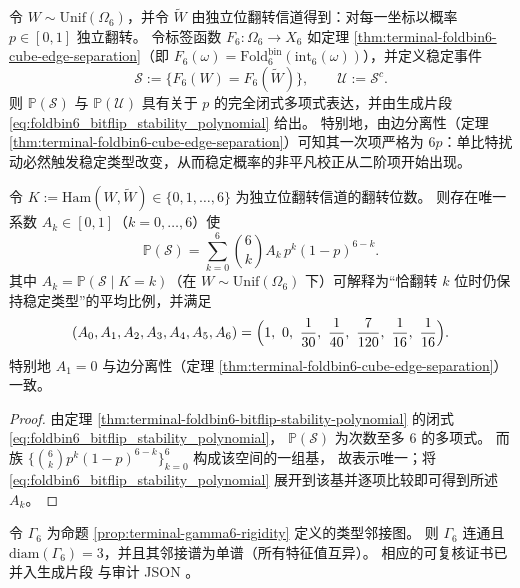 \begin{theorem}\label{thm:terminal-foldbin6-bitflip-stability-polynomial}
令 \(W\sim\mathrm{Unif}(\Omega_6)\)，并令 \(\widetilde W\) 由独立位翻转信道得到：对每一坐标以概率 \(p\in[0,1]\) 独立翻转。
令标签函数 \(F_6:\Omega_6\to X_6\) 如定理 \ref{thm:terminal-foldbin6-cube-edge-separation}（即 \(F_6(\omega)=\mathrm{Fold}^{\mathrm{bin}}_6(\mathrm{int}_6(\omega))\)），并定义稳定事件
\[
\mathcal S:=\{F_6(W)=F_6(\widetilde W)\},
\qquad
\mathcal U:=\mathcal S^c.
\]
则 \(\mathbb{P}(\mathcal S)\) 与 \(\mathbb{P}(\mathcal U)\) 具有关于 \(p\) 的完全闭式多项式表达，并由生成片段 \eqref{eq:foldbin6_bitflip_stability_polynomial} 给出。
特别地，由边分离性（定理 \ref{thm:terminal-foldbin6-cube-edge-separation}）可知其一次项严格为 \(6p\)：单比特扰动必然触发稳定类型改变，从而稳定概率的非平凡校正从二阶项开始出现。
\end{theorem}


\begin{corollary}\label{cor:terminal-foldbin6-bitflip-stability-Ak}
令 \(K:=\mathrm{Ham}(W,\widetilde W)\in\{0,1,\dots,6\}\) 为独立位翻转信道的翻转位数。
则存在唯一系数 \(A_k\in[0,1]\)（\(k=0,\dots,6\)）使
\[
\mathbb{P}(\mathcal S)=\sum_{k=0}^{6}\binom{6}{k}A_k\,p^{k}(1-p)^{6-k}.
\]
其中 \(A_k=\mathbb{P}(\mathcal S\mid K=k)\)（在 \(W\sim\mathrm{Unif}(\Omega_6)\) 下）可解释为“恰翻转 \(k\) 位时仍保持稳定类型”的平均比例，并满足
\[
(A_0,A_1,A_2,A_3,A_4,A_5,A_6)=\Bigl(1,\ 0,\ \frac{1}{30},\ \frac{1}{40},\ \frac{7}{120},\ \frac{1}{16},\ \frac{1}{16}\Bigr).
\]
特别地 \(A_1=0\) 与边分离性（定理 \ref{thm:terminal-foldbin6-cube-edge-separation}）一致。
\end{corollary}
\begin{proof}
由定理 \ref{thm:terminal-foldbin6-bitflip-stability-polynomial} 的闭式 \eqref{eq:foldbin6_bitflip_stability_polynomial}，
\(\mathbb{P}(\mathcal S)\) 为次数至多 \(6\) 的多项式。
而族 \(\{\binom{6}{k}p^k(1-p)^{6-k}\}_{k=0}^6\) 构成该空间的一组基，
故表示唯一；将 \eqref{eq:foldbin6_bitflip_stability_polynomial} 展开到该基并逐项比较即可得到所述 \(A_k\)。
\end{proof}

\begin{corollary}\label{cor:terminal-gamma6-diameter-simple-spectrum}
令 \(\Gamma_6\) 为命题 \ref{prop:terminal-gamma6-rigidity} 定义的类型邻接图。
则 \(\Gamma_6\) 连通且 \(\mathrm{diam}(\Gamma_6)=3\)，并且其邻接谱为单谱（所有特征值互异）。
相应的可复核证书已并入生成片段 \texttt{} 与审计 JSON \texttt{}。
\end{corollary}

